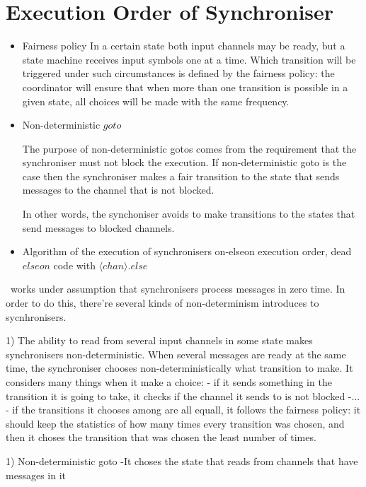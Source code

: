 \section{Execution Order of Synchroniser\label{execod}}
\begin{itemize}
\item Fairness policy
In a certain state both input channels may be ready, but a state machine receives input symbols one at a time. Which transition will be triggered under such circumstances is defined by the fairness policy: the coordinator will ensure that when more than one transition is possible in a given state, all choices will be made with the same frequency.

\item Non-deterministic $goto$

The purpose of non-deterministic gotos comes from the requirement that the synchroniser must not block the execution. If non-deterministic goto is the case then the synchroniser makes a fair transition to the state that sends messages to the channel that is not blocked.

In other words, the synchoniser avoids to make transitions to the states that send messages to blocked channels.


\item Algorithm of the execution of synchronisers
on-elseon execution order, dead $elseon$ code with $\langle chan \rangle .else$
\end{itemize}

\ak\ works under assumption that synchronisers process messages in zero time. In order to do this, there're several kinds of non-determinism introduces to sycnhronisers.

1) The ability to read from several input channels in some state makes synchronisers non-deterministic. When several messages are ready at the same time, the synchroniser chooses non-deterministically what transition to make. 
It considers many things when it make a choice:
- if it sends something in the transition it is going to take, it checks if the channel it sends to is not blocked
-...
- if the transitions it chooses among are all equall, it follows the fairness policy: it should keep the statistics of how many times every transition was chosen, and then it choses the transition that was chosen the least number of times.

1) Non-deterministic goto
-It choses the state that reads from channels that have messages in it



